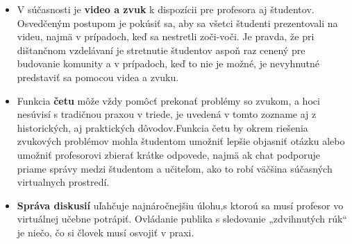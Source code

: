 \documentclass[10pt,twoside,slovak,a4paper]{article}
\begin{document}
\begin{itemize}
\item V súčasnosti je \textbf{video a zvuk} k dispozícii pre profesora aj študentov.\cite{VCf} Osvedčeným postupom je pokúsiť sa,
aby sa všetci študenti prezentovali na videu, najmä v prípadoch, keď sa nestretli zoči-voči. Je pravda,
že pri dištančnom vzdelávaní je stretnutie študentov aspoň raz cenený pre budovanie komunity a v prípadoch,
keď to nie je možné, je nevyhnutné predstaviť sa pomocou videa a zvuku.

	\item Funkcia \textbf{četu} môže vždy pomôcť prekonať problémy so zvukom, a hoci nesúvisí s tradičnou praxou v triede, 
je uvedená v tomto zozname aj z historických, aj praktických dôvodov.\cite{VCf}Funkcia četu by okrem riešenia zvukových problémov 
mohla študentom umožniť lepšie objasniť otázku alebo umožniť profesorovi zbierať krátke odpovede, najmä ak chat podporuje 
priame správy medzi študentom a učiteľom, ako to robí väčšina súčasných virtualnych prostredí.

	\item \textbf{Správa diskusií} uľahčuje najnáročnejšiu úlohu,s ktoroú sa musí profesor vo virtuálnej učebne potrápiť.
Ovládanie publika s sledovanie „zdvihnutých rúk“  je niečo, čo si človek musí osvojiť v praxi.\cite{VCf}
\end{itemize}
\end{document}
